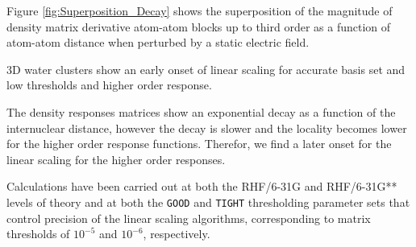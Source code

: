 \documentclass[prl,aps,twocolumn,showpacs,twocolumngrid,superbib]{revtex4}
\begin{document}
Figure \ref{fig:Superposition_Decay} shows the superposition 
of the magnitude of density matrix derivative atom-atom blocks up to 
third order as a function of atom-atom distance when perturbed by 
a static electric field.

3D water clusters show an early onset of linear scaling for accurate
basis set and low thresholds and higher order response.

The density responses matrices show an exponential decay as a function
of the internuclear distance, however the decay is slower and the locality
becomes lower for the higher order response functions.
Therefor, we find a later onset for the linear scaling for the higher order
responses.

Calculations have been carried out at both the RHF/6-31G and RHF/6-31G** levels of
theory and at both the {\tt GOOD} and {\tt TIGHT} thresholding parameter 
sets that control precision of the linear scaling algorithms, corresponding 
to matrix thresholds of $10^{-5}$ and $10^{-6}$, respectively.
\end{document}
